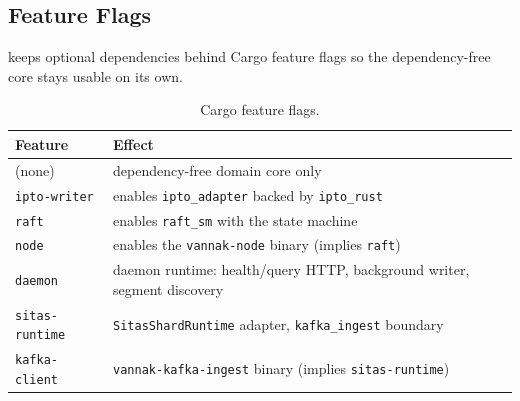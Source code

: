\subsection{Feature Flags}

\vannak{} keeps optional dependencies behind Cargo feature flags so the
dependency-free core stays usable on its own.

\begin{table}[htbp]
\centering
\begin{tabular}{ll}
\hline
Feature & Effect \\
\hline
(none) & dependency-free domain core only \\
\texttt{ipto-writer} & enables \texttt{ipto\_adapter} backed by \texttt{ipto\_rust} \\
\texttt{raft} & enables \texttt{raft\_sm} with the \graft{} state machine \\
\texttt{node} & enables the \texttt{vannak-node} binary (implies \texttt{raft}) \\
\texttt{daemon} & daemon runtime: health/query HTTP, background writer, segment discovery \\
\texttt{sitas-runtime} & \texttt{SitasShardRuntime} adapter, \texttt{kafka\_ingest} boundary \\
\texttt{kafka-client} & \texttt{vannak-kafka-ingest} binary (implies \texttt{sitas-runtime}) \\
\hline
\end{tabular}
\caption{\vannak{} Cargo feature flags.}
\end{table}

\endinput
